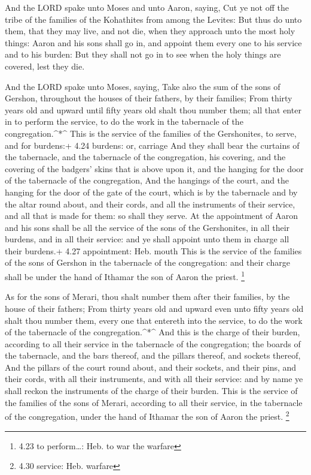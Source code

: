  And the LORD spake unto Moses and unto Aaron, saying,
 Cut ye not off the tribe of the families of the Kohathites
from among the Levites:  But thus do unto them, that they
may live, and not die, when they approach unto the most holy things:
Aaron and his sons shall go in, and appoint them every one to his
service and to his burden:  But they shall not go in to see
when the holy things are covered, lest they die.

 And the LORD spake unto Moses, saying,  Take
also the sum of the sons of Gershon, throughout the houses of their
fathers, by their families;  From thirty years old and
upward until fifty years old shalt thou number them; all that enter in
to perform the service, to do the work in the tabernacle of the
congregation.\^{}*\^{}  This is the service of the families
of the Gershonites, to serve, and for burdens:+ 4.24 burdens: or,
carriage  And they shall bear the curtains of the
tabernacle, and the tabernacle of the congregation, his covering, and
the covering of the badgers' skins that is above upon it, and the
hanging for the door of the tabernacle of the congregation,
 And the hangings of the court, and the hanging for the
door of the gate of the court, which is by the tabernacle and by the
altar round about, and their cords, and all the instruments of their
service, and all that is made for them: so shall they serve.
 At the appointment of Aaron and his sons shall be all the
service of the sons of the Gershonites, in all their burdens, and in all
their service: and ye shall appoint unto them in charge all their
burdens.+ 4.27 appointment: Heb. mouth  This is the service
of the families of the sons of Gershon in the tabernacle of the
congregation: and their charge shall be under the hand of Ithamar the
son of Aaron the priest. \footnote{4.23 to perform\ldots: Heb. to war
  the warfare}

 As for the sons of Merari, thou shalt number them after
their families, by the house of their fathers;  From thirty
years old and upward even unto fifty years old shalt thou number them,
every one that entereth into the service, to do the work of the
tabernacle of the congregation.\^{}*\^{}  And this is the
charge of their burden, according to all their service in the tabernacle
of the congregation; the boards of the tabernacle, and the bars thereof,
and the pillars thereof, and sockets thereof,  And the
pillars of the court round about, and their sockets, and their pins, and
their cords, with all their instruments, and with all their service: and
by name ye shall reckon the instruments of the charge of their burden.
 This is the service of the families of the sons of Merari,
according to all their service, in the tabernacle of the congregation,
under the hand of Ithamar the son of Aaron the priest. \footnote{4.30
  service: Heb. warfare}


